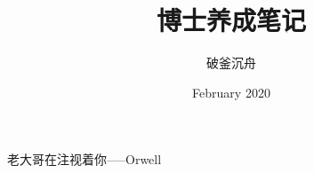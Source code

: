 \documentclass[UTF8]{book}
\title{博士养成笔记}
\author{破釜沉舟}
\date{February 2020}
\begin{document}
\maketitle
老大哥在注视着你-----Orwell

        \tableofcontents












\end{document}
